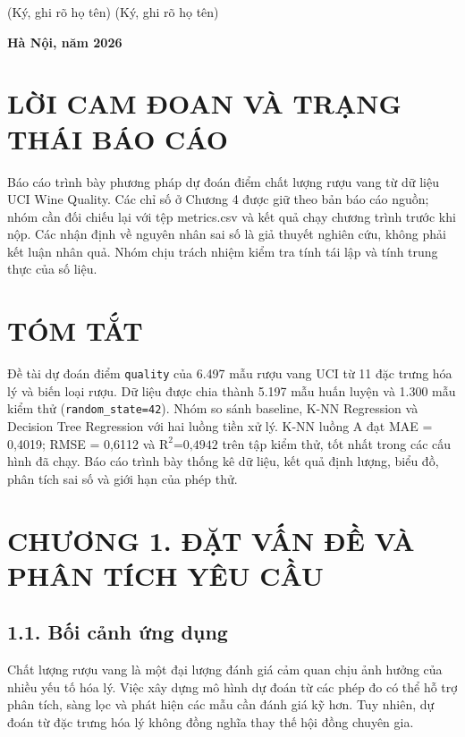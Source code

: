 \documentclass[12pt,a4paper,oneside]{article}
\begin{document}
(Ký, ghi rõ họ tên) (Ký, ghi rõ họ tên)

\textbf{Hà Nội, năm 2026}

\clearpage
\tableofcontents
\clearpage

\section*{LỜI CAM ĐOAN VÀ TRẠNG THÁI BÁO CÁO}

Báo cáo trình bày phương pháp dự đoán điểm chất lượng rượu vang từ dữ
liệu UCI Wine Quality. Các chỉ số ở Chương 4 được giữ theo bản báo cáo
nguồn; nhóm cần đối chiếu lại với tệp metrics.csv và kết quả chạy chương
trình trước khi nộp. Các nhận định về nguyên nhân sai số là giả thuyết
nghiên cứu, không phải kết luận nhân quả. Nhóm chịu trách nhiệm kiểm tra
tính tái lập và tính trung thực của số liệu.

\section*{TÓM TẮT}

Đề tài dự đoán điểm \texttt{quality} của 6.497 mẫu rượu vang UCI từ 11
đặc trưng hóa lý và biến loại rượu. Dữ liệu được chia thành 5.197 mẫu
huấn luyện và 1.300 mẫu kiểm thử (\texttt{random\_state=42}). Nhóm so
sánh baseline, K-NN Regression và Decision Tree Regression với hai luồng
tiền xử lý. K-NN luồng A đạt MAE = 0,4019; RMSE = 0,6112 và
\(\text{R}^{\text{2}}\text{=}\text{0}\text{,}\text{4942}\) trên tập kiểm
thử, tốt nhất trong các cấu hình đã chạy. Báo cáo trình bày thống kê dữ
liệu, kết quả định lượng, biểu đồ, phân tích sai số và giới hạn của phép
thử.

\clearpage
\section*{CHƯƠNG 1. ĐẶT VẤN ĐỀ VÀ PHÂN TÍCH YÊU CẦU}

\subsection*{1.1. Bối cảnh ứng dụng}

Chất lượng rượu vang là một đại lượng đánh giá cảm quan chịu ảnh hưởng
của nhiều yếu tố hóa lý. Việc xây dựng mô hình dự đoán từ các phép đo có
thể hỗ trợ phân tích, sàng lọc và phát hiện các mẫu cần đánh giá kỹ hơn.
Tuy nhiên, dự đoán từ đặc trưng hóa lý không đồng nghĩa thay thế hội
đồng chuyên gia.
\end{document}
